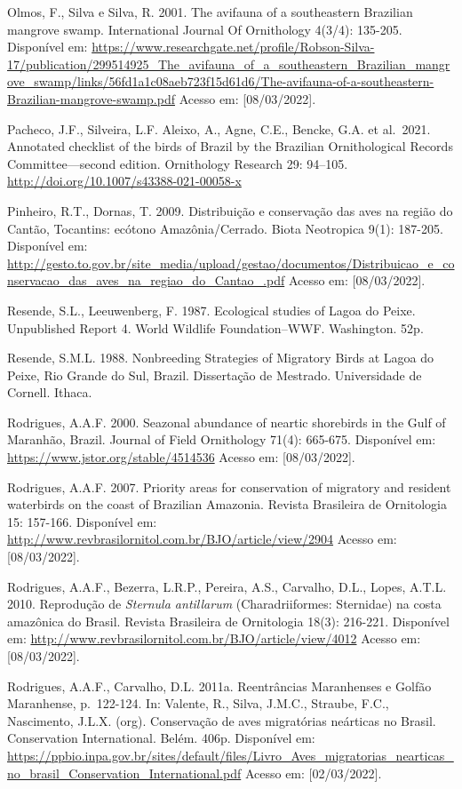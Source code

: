 \documentclass[
  oneside]{scrbook}
\begin{document}
Olmos, F., Silva e Silva, R. 2001. The avifauna of a southeastern Brazilian mangrove swamp. International Journal Of Ornithology 4(3/4): 135-205. Disponível em: \url{https://www.researchgate.net/profile/Robson-Silva-17/publication/299514925_The_avifauna_of_a_southeastern_Brazilian_mangrove_swamp/links/56fd1a1c08aeb723f15d61d6/The-avifauna-of-a-southeastern-Brazilian-mangrove-swamp.pdf} Acesso em: {[}08/03/2022{]}.

Pacheco, J.F., Silveira, L.F. Aleixo, A., Agne, C.E., Bencke, G.A. et al.~2021. Annotated checklist of the birds of Brazil by the Brazilian Ornithological Records Committee---second edition. Ornithology Research 29: 94--105. \url{http://doi.org/10.1007/s43388-021-00058-x}

Pinheiro, R.T., Dornas, T. 2009. Distribuição e conservação das aves na região do Cantão, Tocantins: ecótono Amazônia/Cerrado. Biota Neotropica 9(1): 187-205. Disponível em: \url{http://gesto.to.gov.br/site_media/upload/gestao/documentos/Distribuicao_e_conservacao_das_aves_na_regiao_do_Cantao_.pdf} Acesso em: {[}08/03/2022{]}.

Resende, S.L., Leeuwenberg, F. 1987. Ecological studies of Lagoa do Peixe. Unpublished Report 4. World Wildlife Foundation--WWF. Washington. 52p.

Resende, S.M.L. 1988. Nonbreeding Strategies of Migratory Birds at Lagoa do Peixe, Rio Grande do Sul, Brazil. Dissertação de Mestrado. Universidade de Cornell. Ithaca.

Rodrigues, A.A.F. 2000. Seazonal abundance of neartic shorebirds in the Gulf of Maranhão, Brazil. Journal of Field Ornithology 71(4): 665-675. Disponível em: \url{https://www.jstor.org/stable/4514536} Acesso em: {[}08/03/2022{]}.

Rodrigues, A.A.F. 2007. Priority areas for conservation of migratory and resident waterbirds on the coast of Brazilian Amazonia. Revista Brasileira de Ornitologia 15: 157-166. Disponível em: \url{http://www.revbrasilornitol.com.br/BJO/article/view/2904} Acesso em: {[}08/03/2022{]}.

Rodrigues, A.A.F., Bezerra, L.R.P., Pereira, A.S., Carvalho, D.L., Lopes, A.T.L. 2010. Reprodução de \emph{Sternula antillarum} (Charadriiformes: Sternidae) na costa amazônica do Brasil. Revista Brasileira de Ornitologia 18(3): 216-221. Disponível em: \url{http://www.revbrasilornitol.com.br/BJO/article/view/4012} Acesso em: {[}08/03/2022{]}.

Rodrigues, A.A.F., Carvalho, D.L. 2011a. Reentrâncias Maranhenses e Golfão Maranhense, p.~122-124. In: Valente, R., Silva, J.M.C., Straube, F.C., Nascimento, J.L.X. (org). Conservação de aves migratórias neárticas no Brasil. Conservation International. Belém. 406p. Disponível em: \url{https://ppbio.inpa.gov.br/sites/default/files/Livro_Aves_migratorias_nearticas_no_brasil_Conservation_International.pdf} Acesso em: {[}02/03/2022{]}.
\end{document}
